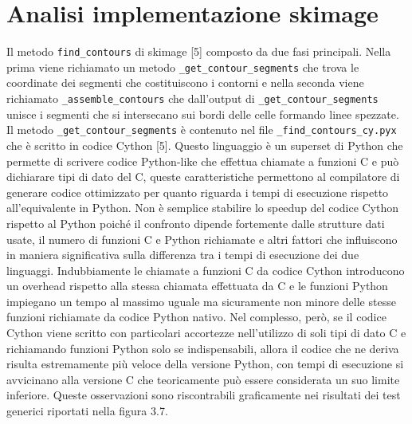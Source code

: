\documentclass[12pt,a4paper]{report}
\begin{document}
\section{Analisi implementazione skimage}
Il metodo \verb|find_contours| di skimage [5] composto da due fasi principali. Nella prima viene richiamato un metodo \verb|_get_contour_segments| che trova le coordinate dei segmenti che costituiscono i contorni e nella seconda viene richiamato \verb|_assemble_contours| che dall'output di \verb|_get_contour_segments| unisce i segmenti che si intersecano sui bordi delle celle formando linee spezzate. \newline
Il metodo \verb|_get_contour_segments| è contenuto nel file \verb|_find_contours_cy.pyx| che è scritto in codice Cython [5]. Questo linguaggio è un superset di Python che permette di scrivere codice Python-like che effettua chiamate a funzioni C e può dichiarare tipi di dato del C, queste caratteristiche permettono al compilatore di generare codice ottimizzato per quanto riguarda i tempi di esecuzione rispetto all'equivalente in Python. \newline
Non è semplice stabilire lo speedup del codice Cython rispetto al Python poiché il confronto dipende fortemente dalle strutture dati usate, il numero di funzioni C e Python richiamate e altri fattori che influiscono in maniera significativa sulla differenza tra i tempi di esecuzione dei due linguaggi. Indubbiamente le chiamate a funzioni C da codice Cython introducono un overhead rispetto alla stessa chiamata effettuata da C e le funzioni Python impiegano un tempo al massimo uguale ma sicuramente non minore delle stesse funzioni richiamate da codice Python nativo. \newline
Nel complesso, però, se il codice Cython viene scritto con particolari accortezze nell'utilizzo di soli tipi di dato C e richiamando funzioni Python solo se indispensabili, allora il codice che ne deriva risulta estremamente più veloce della versione Python, con tempi di esecuzione si avvicinano alla versione C che teoricamente può essere considerata un suo limite inferiore. Queste osservazioni sono riscontrabili graficamente nei risultati dei test generici riportati nella figura 3.7. 
\end{document}
